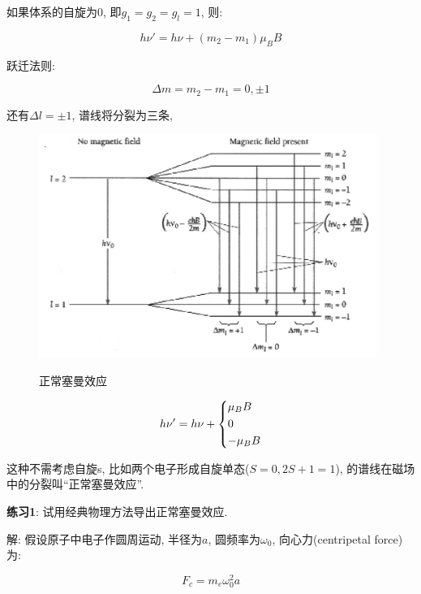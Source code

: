 如果体系的自旋为0, 即$g_1 = g_2 =g_l =1$, 则:

\begin{equation*}
h\nu'  = h\nu + (m_2 -m_1)\mu_B B
\end{equation*}


跃迁法则:

\begin{equation*}
\Delta m = m_2 - m_1= 0, \pm 1
\end{equation*}

还有$\Delta l = \pm 1$, 谱线将分裂为三条,

\begin{figure}[h]
\begin{center}
  \includegraphics[width=11cm]{Spectrum/normal_zeeman_effect.ps}\\
  \caption{正常塞曼效应}\label{Normal Zeeman Effect}
\end{center}
\end{figure}


\begin{equation*}
h \nu' = h\nu + \left\{ \begin{gathered}
  \mu_B B \hfill \\
  0 \hfill \\
  -\mu_B B \hfill \\
\end{gathered}  \right.
\end{equation*}


这种不需考虑自旋s, 比如两个电子形成自旋单态($S=0, 2S+1=1$),
的谱线在磁场中的分裂叫``正常塞曼效应''.


\textbf{练习1}: 试用经典物理方法导出正常塞曼效应.

解: 假设原子中电子作圆周运动, 半径为$a$, 圆频率为$\omega_0$,
向心力(centripetal force)为:

\begin{equation*}
    F_c = m_e \omega_0^2 a
\end{equation*}

